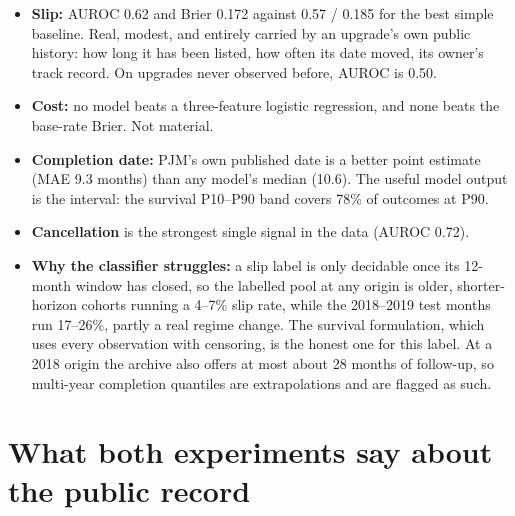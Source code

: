 \documentclass[11pt,a4paper]{article}
\begin{document}
\begin{itemize}
\item \textbf{Slip:} AUROC 0.62 and Brier 0.172 against 0.57 / 0.185 for the best simple baseline. Real, modest, and
  entirely carried by an upgrade's own public history: how long it has been listed, how often its date moved, its
  owner's track record. On upgrades never observed before, AUROC is 0.50.
\item \textbf{Cost:} no model beats a three-feature logistic regression, and none beats the base-rate Brier. Not material.
\item \textbf{Completion date:} PJM's own published date is a better point estimate (MAE 9.3 months) than any model's
  median (10.6). The useful model output is the interval: the survival P10--P90 band covers 78\% of outcomes at P90.
\item \textbf{Cancellation} is the strongest single signal in the data (AUROC 0.72).
\item \textbf{Why the classifier struggles:} a slip label is only decidable once its 12-month window has closed, so the
  labelled pool at any origin is older, shorter-horizon cohorts running a 4--7\% slip rate, while the 2018--2019 test
  months run 17--26\%, partly a real regime change. The survival formulation, which uses every observation with
  censoring, is the honest one for this label. At a 2018 origin the archive also offers at most about 28 months of
  follow-up, so multi-year completion quantiles are extrapolations and are flagged as such.
\end{itemize}

\section*{What both experiments say about the public record}
\end{document}
